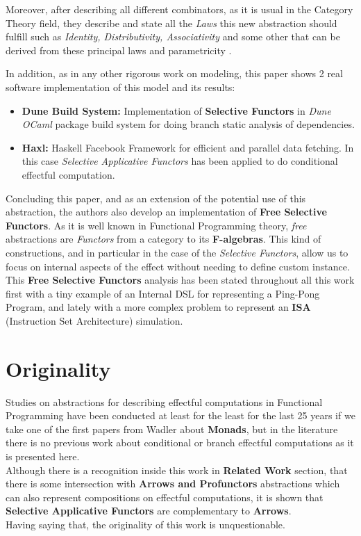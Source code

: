 \documentclass[12pt, a4paper]{article}
\begin{document}
Moreover, after describing all different combinators, as it is usual in the Category
Theory field, they describe and state all the \textit{Laws} this new abstraction
should fulfill such as \textit{Identity, Distributivity, Associativity} and some
other that can be derived from these principal laws and parametricity
\cite{wadler_theorems}.

In addition, as in any other rigorous work on modeling, this paper shows 2 real software
implementation of this model and its results:

\begin{itemize}
  \item \textbf{Dune Build System:} Implementation of \textbf{Selective
      Functors} in \textit{Dune OCaml} package build system for doing branch static analysis of
    dependencies.
  \item \textbf{Haxl:} Haskell Facebook Framework for efficient and parallel
    data fetching. In this case \textit{Selective Applicative Functors} has been
    applied to do conditional effectful computation.  
\end{itemize}

Concluding this paper, and as an extension of the potential use of this abstraction, the
authors also develop an implementation of \textbf{Free Selective Functors}. As
it is well known in Functional Programming theory, \textit{free} abstractions
are \textit{Functors} from a category to its \textbf{F-algebras}. This
kind of constructions, and in particular in the case of the \textit{Selective
  Functors}, allow us to focus on internal aspects of the effect without needing
to define custom instance.\\
This \textbf{Free Selective Functors} analysis has been stated throughout all
this work first with a tiny example of an Internal DSL for representing a
Ping-Pong Program, and lately with a more complex problem to represent an \textbf{ISA}
(Instruction Set Architecture) simulation.

\section{Originality}
Studies on abstractions for describing effectful computations in Functional
Programming have been conducted at least for the least for the last 25 years if
we take one of the first papers from Wadler \cite{wadler_monads} about
\textbf{Monads}, but in the literature there is no previous work about
conditional or branch effectful computations as it is presented here.\\
Although there is a recognition inside this work in \textbf{Related Work}
section, that there is some intersection with \textbf{Arrows and Profunctors}
abstractions which can also represent compositions on effectful computations, it
is shown that \textbf{Selective Applicative Functors} are complementary to
\textbf{Arrows}.\\
Having saying that, the originality of this work is unquestionable.
\end{document}
